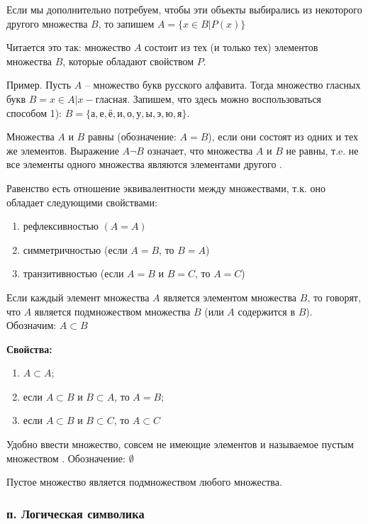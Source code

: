     Если мы дополнительно потребуем, чтобы эти объекты выбирались из некоторого 
    другого множества $B$, то запишем $A = \{ x \in B | P(x)\}$

    Читается это так: множество $A$ состоит из тех (и только тех) элементов 
    множества $B$, которые обладают свойством $P$.

    Пример. Пусть $A$ -- множество букв русского алфавита. Тогда множество 
    гласных букв $B = {x \in A | x - \text{гласная}}$. Запишем, что здесь 
    можно воспользоваться способом 1): $B = \{\text{а}, \text{е}, \text{ё}, 
    \text{и}, \text{о}, \text{у}, \text{ы}, \text{э}, \text{ю}, \text{я}\}$.
    
    Множества $A$ и $B$ равны (обозначение: $A = B$), если они состоят из 
    одних и тех же элементов. Выражение $A \neg B$ означает, что множества 
    $A$ и $B$ не равны, т.e. не все элементы одного множества являются 
    элементами другого .

    Равенство есть отношение эквивалентности между множествами, т.к. оно 
    обладает следующими свойствами:
    \begin{enumerate}
        \item рефлексивностью $(A = A)$
        \item симметричностью (если $A = B$, то $B = A$)
        \item транзитивностью (если $A = B$ и $B = C$, то $A = C$)
    \end{enumerate}

    Если каждый элемент множества $A$ является элементом множества 
    $B$, то говорят, что $A$ является подмножеством множества $B$ 
    (или $A$ содержится в $B$). Обозначим: $A \subset B$

    \textbf{Свойства:}
    \begin{enumerate}
        \item $A \subset A$;
        \item если $A \subset B$ и $B \subset A$, то $A = B$;
        \item если $A \subset B$ и $B \subset C$, то $A \subset C$
    \end{enumerate}

    Удобно ввести множество, совсем не имеющие элементов и 
    называемое пустым множеством . Обозначение: $\emptyset$
    
    Пустое множество является подмножеством любого множества.

    \subsubsection{п. Логическая символика}

